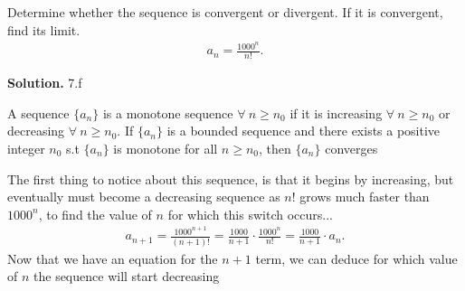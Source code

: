 \documentclass{report}
\begin{document}
    \bigbreak \noindent 
    \begin{eg}
       Determine whether the sequence is convergent or divergent. If it is convergent, find its limit. 
       \begin{align*}
           a_{n}= \frac{1000^{n}}{n!}
       .\end{align*}
    \end{eg}
    \bigbreak \noindent 
    \textbf{Solution.} 
        7.f
    \bigbreak \noindent 
    \begin{remark}
        A sequence $\{a_{n}\} $ is a monotone sequence $\forall\ n \geq n_{0}$ if it is increasing $\forall\ n \geq n_{0}$ or decreasing $\forall\ n \geq n_{0}$. If $\{a_{n}\}$ is a bounded sequence  and there exists a positive integer $n_{0}$ s.t $\{a_{n}\} $ is monotone for all $n \geq n_{0}$, then $\{a_{n}\} $ converges
    \end{remark}
    \bigbreak \noindent 
    The first thing to notice about this sequence, is that it begins by increasing, but eventually must become a decreasing sequence as $n!$ grows much faster than $1000^{n}$, to find the value of $n$ for which this switch occurs...
    \bigbreak \noindent 
    \begin{align*}
        a_{n+1} = \frac{1000^{n+1}}{(n+1)!} = \frac{1000}{n+1} \cdot  \frac{1000^{n}}{n!} = \frac{1000}{n+1}\cdot a_{n}
    .\end{align*}
    \bigbreak \noindent 
    Now that we have an equation for the $n+1$ term, we can deduce for which value of $n$ the sequence will start decreasing
\end{document}
